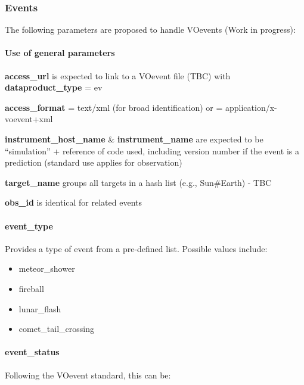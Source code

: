 \documentclass[11pt,a4paper]{ivoa}
\begin{document}
\subsubsection{Events\\}

The following parameters are proposed to handle VOevents (Work in progress):

\paragraph{Use of general parameters\textbf{ }}


\textbf{access\_url} is expected to link to a VOevent file (TBC) with \textbf{dataproduct\_type} = ev 

\textbf{access\_format} = text/xml (for broad identification) or = application/x-voevent+xml 

\textbf{instrument\_host\_name }\& \textbf{instrument\_name} are expected to be ``simulation'' + reference of code used, including version number if the event is a prediction (standard use applies for observation)

\textbf{target\_name} groups all targets in a hash list (e.g., Sun\#Earth) - TBC

\textbf{obs\_id} is identical for related events

\paragraph{event\_type}

Provides a type of event from a pre-defined list. Possible values include:

\begin{itemize}

\item meteor\_shower

\item fireball

\item lunar\_flash

\item comet\_tail\_crossing

\end{itemize}

\paragraph{event\_status}

Following the VOevent standard, this can be:
\end{document}
